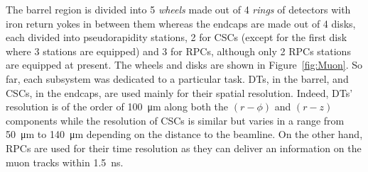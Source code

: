 	The barrel region is divided into 5 \textit{wheels} made out of 4 \textit{rings} of detectors with iron return yokes in between them whereas the endcaps are made out of 4 disks, each divided into pseudorapidity stations, 2 for CSCs (except for the first disk where 3 stations are equipped) and 3 for RPCs, although only 2 RPCs stations are equipped at present. The wheels and disks are shown in Figure~\ref{fig:Muon}. So far, each subsystem was dedicated to a particular task. DTs, in the barrel, and CSCs, in the endcaps, are used mainly for their spatial resolution. Indeed, DTs' resolution is of the order of \SI{100}{\micro m} along both the $(r-\phi)$ and $(r-z)$ components while the resolution of CSCs is similar but varies in a range from \SI{50}{\micro m} to \SI{140}{\micro m} depending on the distance to the beamline. On the other hand, RPCs are used for their time resolution as they can deliver an information on the muon tracks within \SI{1.5}{ns}.
	
